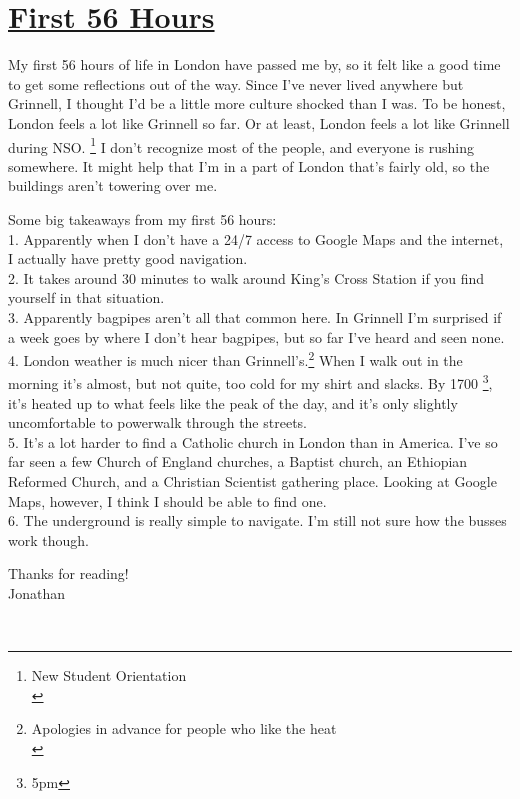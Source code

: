 \hypertarget{first-56-hours}{%
\section{\href{first-56-hours.html}{First 56 Hours}}\label{first-56-hours}}

My first 56 hours of life in London have passed me by, so it felt like a
good time to get some reflections out of the way. Since I've never lived
anywhere but Grinnell, I thought I'd be a little more culture shocked
than I was. To be honest, London feels a lot like Grinnell so far. Or at
least, London feels a lot like Grinnell during NSO. \footnote{New
  Student Orientation\\} I don't recognize most of the people, and
everyone is rushing somewhere. It might help that I'm in a part of
London that's fairly old, so the buildings aren't towering over me.

Some big takeaways from my first 56 hours:\\
1. Apparently when I don't have a 24/7 access to Google Maps and the
internet, I actually have pretty good navigation.\\
2. It takes around 30 minutes to walk around King's Cross Station if you
find yourself in that situation.\\
3. Apparently bagpipes aren't all that common here. In Grinnell I'm
surprised if a week goes by where I don't hear bagpipes, but so far I've
heard and seen none.\\
4. London weather is much nicer than Grinnell's.\footnote{Apologies in
  advance for people who like the heat\\} When I walk out in the morning
it's almost, but not quite, too cold for my shirt and slacks. By 1700
\footnote{5pm}, it's heated up to what feels like the peak of the day,
and it's only slightly uncomfortable to powerwalk through the streets.\\
5. It's a lot harder to find a Catholic church in London than in
America. I've so far seen a few Church of England churches, a Baptist
church, an Ethiopian Reformed Church, and a Christian Scientist
gathering place. Looking at Google Maps, however, I think I should be
able to find one.\\
6. The underground is really simple to navigate. I'm still not sure how
the busses work though.

Thanks for reading!\\
Jonathan

~
